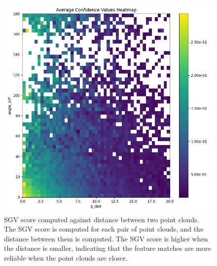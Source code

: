 \begin{figure}[t]
  \centering
  \includegraphics*[width=0.8\columnwidth]{pics/methods_svg_distance.png}
  \caption{SGV score computed against distance between two point clouds. The SGV score is computed for each pair of point clouds, and the distance between them is computed. The SGV score is higher when the distance is smaller, indicating that the feature matches are more reliable when the point clouds are closer.}
  \label{fig:sgv_distance}
\end{figure}


